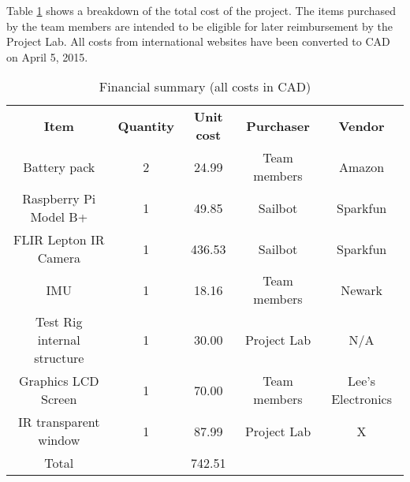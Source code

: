 
Table \ref{tab:financialsummary} shows a breakdown of the total cost of the project. The items purchased by the team members are intended to be eligible for later reimbursement by the Project Lab. All costs from international websites have been converted to CAD on April 5, 2015.

\begin{table}[H]
\caption[Financial summary]{\label{tab:financialsummary}Financial summary (all costs in CAD)}
\begin{tabular}{c|c|c|c|c}
\textbf{Item} & \textbf{Quantity} & \textbf{Unit cost} & \textbf{Purchaser} & \textbf{Vendor}\\
Battery pack & 2 & 24.99 & Team members & Amazon\\
Raspberry Pi Model B+ & 1 & 49.85 & Sailbot & Sparkfun\\
FLIR Lepton IR Camera & 1 & 436.53 & Sailbot & Sparkfun\\
IMU & 1 & 18.16 & Team members & Newark\\
Test Rig internal structure & 1 & 30.00 & Project Lab & N/A\\
Graphics LCD Screen & 1 & 70.00 & Team members & Lee's Electronics\\
IR transparent window & 1 & 87.99 & Project Lab & X\\\hline
Total & & 742.51 & & \\

\end{tabular}
\end{table}